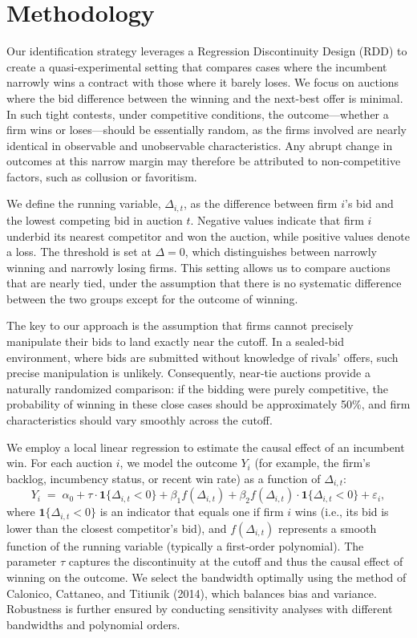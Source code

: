 \section{Methodology}\label{coll}

Our identification strategy leverages a Regression Discontinuity Design (RDD) to create a quasi-experimental setting that compares cases where the incumbent narrowly wins a contract with those where it barely loses. We focus on auctions where the bid difference between the winning and the next-best offer is minimal. In such tight contests, under competitive conditions, the outcome—whether a firm wins or loses—should be essentially random, as the firms involved are nearly identical in observable and unobservable characteristics. Any abrupt change in outcomes at this narrow margin may therefore be attributed to non-competitive factors, such as collusion or favoritism.

We define the running variable, $\Delta_{i,t}$, as the difference between firm $i$’s bid and the lowest competing bid in auction $t$. Negative values indicate that firm $i$ underbid its nearest competitor and won the auction, while positive values denote a loss. The threshold is set at $\Delta=0$, which distinguishes between narrowly winning and narrowly losing firms. This setting allows us to compare auctions that are nearly tied, under the assumption that there is no systematic difference between the two groups except for the outcome of winning.

The key to our approach is the assumption that firms cannot precisely manipulate their bids to land exactly near the cutoff. In a sealed-bid environment, where bids are submitted without knowledge of rivals’ offers, such precise manipulation is unlikely. Consequently, near-tie auctions provide a naturally randomized comparison: if the bidding were purely competitive, the probability of winning in these close cases should be approximately 50\%, and firm characteristics should vary smoothly across the cutoff.

We employ a local linear regression to estimate the causal effect of an incumbent win. For each auction $i$, we model the outcome $Y_{i}$ (for example, the firm’s backlog, incumbency status, or recent win rate) as a function of $\Delta_{i,t}$:
\[
Y_{i} \;=\; \alpha_0 + \tau \cdot \mathbf{1}\{\Delta_{i,t} < 0\} + \beta_1 f(\Delta_{i,t}) + \beta_2 f(\Delta_{i,t}) \cdot \mathbf{1}\{\Delta_{i,t} < 0\} + \varepsilon_{i},
\]
where $\mathbf{1}\{\Delta_{i,t} < 0\}$ is an indicator that equals one if firm $i$ wins (i.e., its bid is lower than the closest competitor’s bid), and $f(\Delta_{i,t})$ represents a smooth function of the running variable (typically a first-order polynomial). The parameter $\tau$ captures the discontinuity at the cutoff and thus the causal effect of winning on the outcome. We select the bandwidth optimally using the method of Calonico, Cattaneo, and Titiunik (2014), which balances bias and variance. Robustness is further ensured by conducting sensitivity analyses with different bandwidths and polynomial orders.

